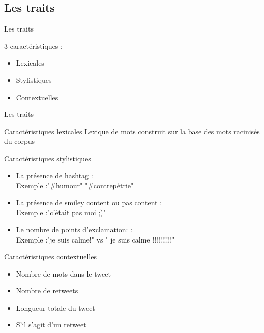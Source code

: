 \documentclass{beamer}
\begin{document}
\subsection{Les traits}
\begin{frame}{Les traits}

3 caractéristiques : 
\begin{itemize}
  \item Lexicales
  \item Stylistiques
  \item Contextuelles
\end{itemize}


\end{frame}






\begin{frame}[allowframebreaks]{Les traits}

\begin{block}{Caractéristiques lexicales}
Lexique de mots construit sur la base des mots racinisés du corpus

\end{block}


\begin{block}{Caractéristiques stylistiques} 
\begin{itemize}
\item La présence de hashtag :\\
Exemple :"\#humour" "\#contrepètrie"
\item La présence de smiley content ou pas content :\\
Exemple :"c'était pas moi ;)"
\item Le nombre de points d'exclamation: :\\
Exemple :"je suis calme!" vs " je suis calme !!!!!!!!!!" 
\end{itemize}
\end{block}


\begin{block}{Caractéristiques contextuelles}
\begin{itemize}
  \item Nombre de mots dans le tweet
  \item Nombre de retweets
  \item Longueur totale du tweet
  \item S'il s'agit d'un retweet
\end{itemize}
\end{block}


\end{frame}
\end{document}

